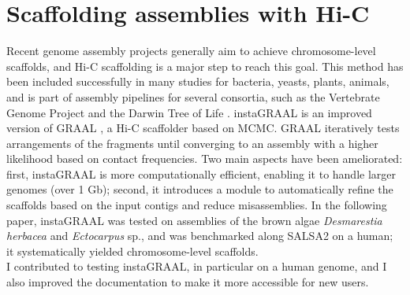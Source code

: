 
\chapter{Scaffolding assemblies with Hi-C}

Recent genome assembly projects generally aim to achieve chromosome-level scaffolds, and Hi-C scaffolding is a major step to reach this goal. This method has been included successfully in many studies for bacteria, yeasts, plants, animals, and is part of assembly pipelines for several consortia, such as the Vertebrate Genome Project \cite{vgp} and the Darwin Tree of Life \cite{dtol}. instaGRAAL is an improved version of GRAAL \cite{graal}, a Hi-C scaffolder based on MCMC. GRAAL iteratively tests arrangements of the fragments until converging to an assembly with a higher likelihood based on contact frequencies. Two main aspects have been ameliorated: first, instaGRAAL is more computationally efficient, enabling it to handle larger genomes (over 1 Gb); second, it introduces a module to automatically refine the scaffolds based on the input contigs and reduce misassemblies. In the following paper, instaGRAAL was tested on assemblies of the brown algae \textit{Desmarestia herbacea} and \textit{Ectocarpus} sp., and was benchmarked along SALSA2 \cite{salsa2} on a human; it systematically yielded chromosome-level scaffolds. \\
I contributed to testing instaGRAAL, in particular on a human genome, and I also improved the documentation to make it more accessible for new users.

